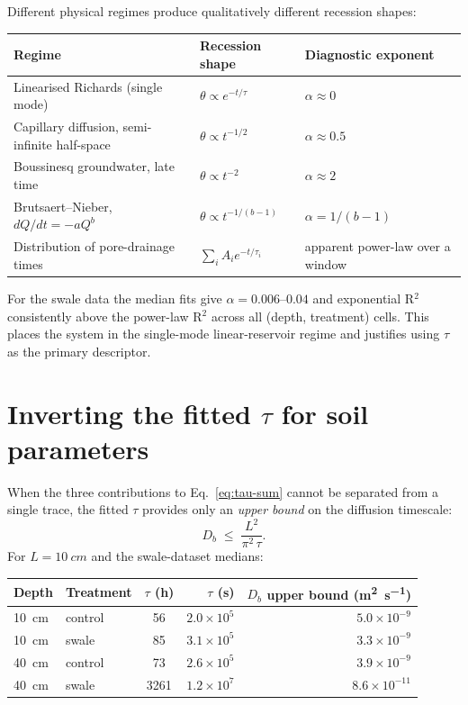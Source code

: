\documentclass[11pt]{article}
\begin{document}
Different physical regimes produce qualitatively different recession
shapes:

\begin{center}
\renewcommand{\arraystretch}{1.25}
\begin{tabular}{@{} l l l @{}}
\toprule
Regime & Recession shape & Diagnostic exponent \\
\midrule
Linearised Richards (single mode) & $\theta \propto e^{-t/\tau}$ & $\alpha \approx 0$ \\
Capillary diffusion, semi-infinite half-space & $\theta \propto t^{-1/2}$ & $\alpha \approx 0.5$ \\
Boussinesq groundwater, late time & $\theta \propto t^{-2}$ & $\alpha \approx 2$ \\
Brutsaert--Nieber, $dQ/dt = -aQ^b$ & $\theta \propto t^{-1/(b-1)}$ & $\alpha = 1/(b-1)$ \\
Distribution of pore-drainage times & $\sum_i A_i e^{-t/\tau_i}$ & apparent power-law over a window \\
\bottomrule
\end{tabular}
\end{center}

For the swale data the median fits give $\alpha = 0.006$--$0.04$ and
exponential R$^2$ consistently above the power-law R$^2$ across all
(depth, treatment) cells. This places the system in the single-mode
linear-reservoir regime and justifies using $\tau$ as the primary
descriptor.

\section{Inverting the fitted \texorpdfstring{$\tau$}{tau} for soil parameters}

When the three contributions to Eq.~\eqref{eq:tau-sum} cannot be
separated from a single trace, the fitted $\tau$ provides only an
\emph{upper bound} on the diffusion timescale:
\begin{equation}
    D_b \;\le\; \frac{L^2}{\pi^2\,\tau}.
    \label{eq:D-bound}
\end{equation}
For $L = \SI{10}{cm}$ and the swale-dataset medians:

\begin{center}
\begin{tabular}{@{} l l c r r @{}}
\toprule
Depth & Treatment & $\tau$ (h) & $\tau$ (s) & $D_b$ upper bound (\si{\meter\squared\per\second}) \\
\midrule
\SI{10}{cm} & control & 56   & $2.0\times 10^{5}$ & $5.0\times 10^{-9}$ \\
\SI{10}{cm} & swale   & 85   & $3.1\times 10^{5}$ & $3.3\times 10^{-9}$ \\
\SI{40}{cm} & control & 73   & $2.6\times 10^{5}$ & $3.9\times 10^{-9}$ \\
\SI{40}{cm} & swale   & 3261 & $1.2\times 10^{7}$ & $8.6\times 10^{-11}$ \\
\bottomrule
\end{tabular}
\end{center}
\end{document}

